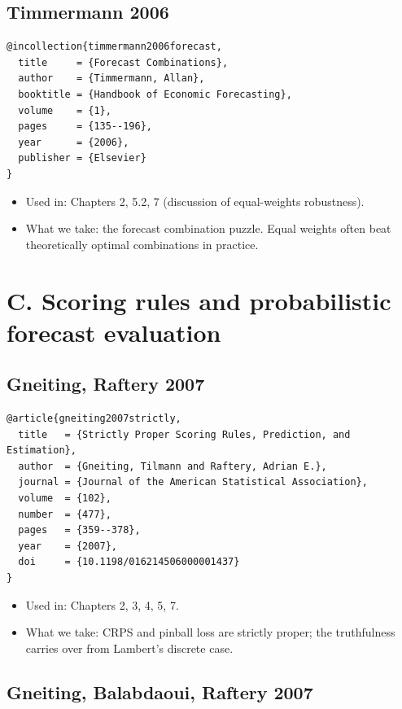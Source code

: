 \documentclass[11pt,a4paper,openany]{report}
\begin{document}
\subsection{Timmermann 2006}

\begin{verbatim}
@incollection{timmermann2006forecast,
  title     = {Forecast Combinations},
  author    = {Timmermann, Allan},
  booktitle = {Handbook of Economic Forecasting},
  volume    = {1},
  pages     = {135--196},
  year      = {2006},
  publisher = {Elsevier}
}
\end{verbatim}

\begin{itemize}
  \item Used in: Chapters 2, 5.2, 7 (discussion of equal-weights
    robustness).
  \item What we take: the forecast combination puzzle. Equal weights
    often beat theoretically optimal combinations in practice.
\end{itemize}

\section{C. Scoring rules and probabilistic forecast evaluation}

\subsection{Gneiting, Raftery 2007}

\begin{verbatim}
@article{gneiting2007strictly,
  title   = {Strictly Proper Scoring Rules, Prediction, and Estimation},
  author  = {Gneiting, Tilmann and Raftery, Adrian E.},
  journal = {Journal of the American Statistical Association},
  volume  = {102},
  number  = {477},
  pages   = {359--378},
  year    = {2007},
  doi     = {10.1198/016214506000001437}
}
\end{verbatim}

\begin{itemize}
  \item Used in: Chapters 2, 3, 4, 5, 7.
  \item What we take: CRPS and pinball loss are strictly proper; the
    truthfulness carries over from Lambert's discrete case.
\end{itemize}

\subsection{Gneiting, Balabdaoui, Raftery 2007}
\end{document}
